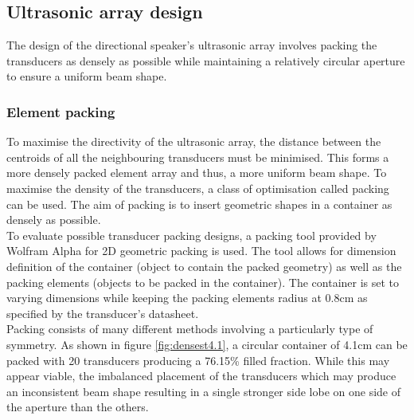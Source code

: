 \subsection{Ultrasonic array design}
The design of the directional speaker's ultrasonic array involves packing the transducers as densely as possible while maintaining a relatively circular aperture to ensure a uniform beam shape.
\subsubsection{Element packing}
To maximise the directivity of the ultrasonic array, the distance between the centroids of all the neighbouring transducers must be minimised. This forms a more densely packed element array and thus, a more uniform beam shape.
To maximise the density of the transducers, a class of optimisation called packing can be used. The aim of packing is to insert geometric shapes in a container as densely as possible.\\
To evaluate possible transducer packing designs, a packing tool provided by Wolfram Alpha for 2D geometric packing \cite{alpha_2018} is used. The tool allows for dimension definition of the container (object to contain the packed geometry) as well as the packing elements (objects to be packed in the container). The container is set to varying dimensions while keeping the packing elements radius at 0.8cm as specified by the transducer's datasheet.\\
Packing consists of many different methods involving a particularly type of symmetry. As shown in figure \ref{fig:densest4.1}, a circular container of 4.1cm can be packed with 20 transducers producing a 76.15\% filled fraction. While this may appear viable, the imbalanced placement of the transducers which may produce an inconsistent beam shape resulting in a single stronger side lobe on one side of the aperture than the others.
\newpage
